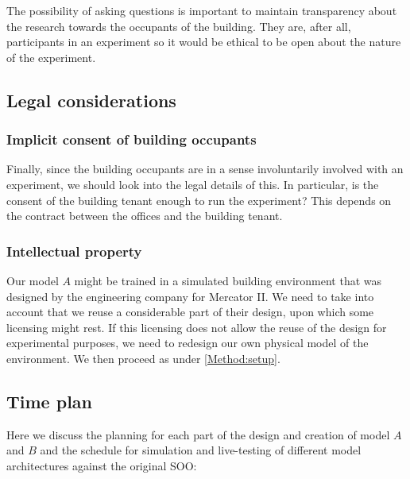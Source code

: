 \documentclass{article}
\theoremstyle{definition}
\theoremstyle{remark}
\begin{document}
The possibility of asking questions is important to maintain transparency about the research towards the occupants of the building. They are, after all, participants in an experiment so it would be ethical to be open about the nature of the experiment.

\subsection{Legal considerations}
\subsubsection{Implicit consent of building occupants}
Finally, since the building occupants are in a sense involuntarily involved with an experiment, we should look into the legal details of this. In particular, is the consent of the building tenant enough to run the experiment? This depends on the contract between the offices and the building tenant.

\subsubsection{Intellectual property}
Our model $A$ might be trained in a simulated building environment that was designed by the engineering company for Mercator II. We need to take into account that we reuse a considerable part of their design, upon which some licensing might rest. If this licensing does not allow the reuse of the design for experimental purposes, we need to redesign our own physical model of the environment. We then proceed as under \ref{Method:setup}.

\subsection{Time plan} \label{time plan}
\FloatBarrier
Here we discuss the planning for each part of the design and creation of model $A$ and $B$ and the schedule for simulation and live-testing of different model architectures against the original SOO:
\end{document}
